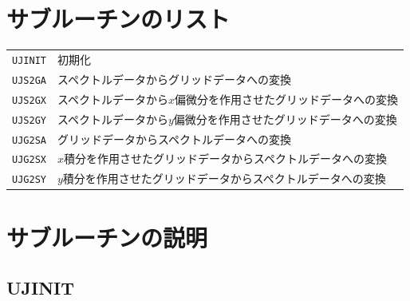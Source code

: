\documentclass[a4j,fleqn]{jarticle}
\begin{document}

\section{サブルーチンのリスト}

\vspace{1em}
\begin{tabular}{ll}
{\tt UJINIT} & 初期化\\
{\tt UJS2GA} & スペクトルデータからグリッドデータへの変換\\
{\tt UJS2GX} & スペクトルデータから$x$偏微分を作用させたグリッドデータへの変換\\
{\tt UJS2GY} & スペクトルデータから$y$偏微分を作用させたグリッドデータへの変換\\
{\tt UJG2SA} & グリッドデータからスペクトルデータへの変換\\
{\tt UJG2SX} & $x$積分を作用させたグリッドデータからスペクトルデータへの変換\\
{\tt UJG2SY} & $y$積分を作用させたグリッドデータからスペクトルデータへの変換
\end{tabular}


\section{サブルーチンの説明}

\subsection{UJINIT}
\end{document}
